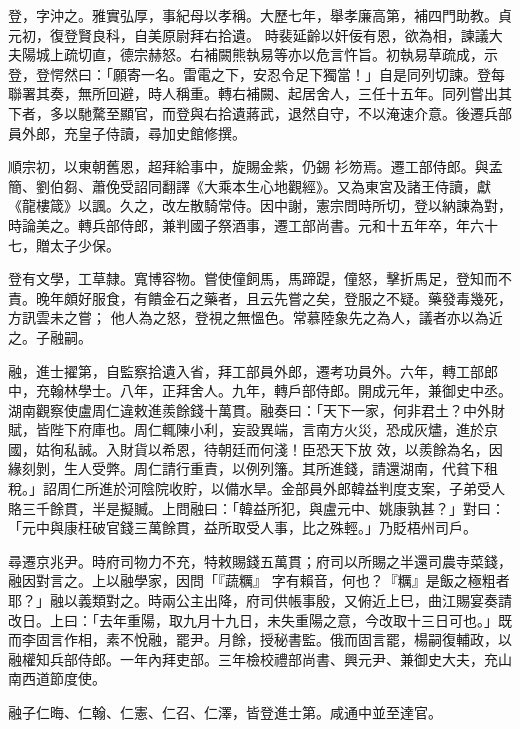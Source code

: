 \begin{pinyinscope}
 登，字沖之。雅實弘厚，事紀母以孝稱。大歷七年，舉孝廉高第，補四門助教。貞元初，復登賢良科，自美原尉拜右拾遺。
 時裴延齡以奸佞有恩，欲為相，諫議大夫陽城上疏切直，德宗赫怒。右補闕熊執易等亦以危言忤旨。初執易草疏成，示登，登愕然曰：「願寄一名。雷電之下，安忍令足下獨當！」自是同列切諫。登每聯署其奏，無所回避，時人稱重。轉右補闕、起居舍人，三任十五年。同列嘗出其下者，多以馳騖至顯官，而登與右拾遺蔣武，退然自守，不以淹速介意。後遷兵部員外郎，充皇子侍讀，尋加史館修撰。



 順宗初，以東朝舊恩，超拜給事中，旋賜金紫，仍錫
 衫笏焉。遷工部侍郎。與孟簡、劉伯芻、蕭俛受詔同翻譯《大乘本生心地觀經》。又為東宮及諸王侍讀，獻《龍樓箴》以諷。久之，改左散騎常侍。因中謝，憲宗問時所切，登以納諫為對，時論美之。轉兵部侍郎，兼判國子祭酒事，遷工部尚書。元和十五年卒，年六十七，贈太子少保。



 登有文學，工草隸。寬博容物。嘗使僮飼馬，馬蹄踶，僮怒，擊折馬足，登知而不責。晚年頗好服食，有饋金石之藥者，且云先嘗之矣，登服之不疑。藥發毒幾死，方訊雲未之嘗；
 他人為之怒，登視之無慍色。常慕陸象先之為人，議者亦以為近之。子融嗣。



 融，進士擢第，自監察拾遺入省，拜工部員外郎，遷考功員外。六年，轉工部郎中，充翰林學士。八年，正拜舍人。九年，轉戶部侍郎。開成元年，兼御史中丞。湖南觀察使盧周仁違敕進羨餘錢十萬貫。融奏曰：「天下一家，何非君土？中外財賦，皆陛下府庫也。周仁輒陳小利，妄設異端，言南方火災，恐成灰燼，進於京國，姑徇私誠。入財貨以希恩，待朝廷而何淺！臣恐天下放
 效，以羨餘為名，因緣刻剝，生人受弊。周仁請行重責，以例列籓。其所進錢，請還湖南，代貧下租稅。」詔周仁所進於河陰院收貯，以備水旱。金部員外郎韓益判度支案，子弟受人賂三千餘貫，半是擬贓。上問融曰：「韓益所犯，與盧元中、姚康孰甚？」對曰：「元中與康枉破官錢三萬餘貫，益所取受人事，比之殊輕。」乃貶梧州司戶。



 尋遷京兆尹。時府司物力不充，特敕賜錢五萬貫；府司以所賜之半還司農寺菜錢，融因對言之。上以融學家，因問「『蔬糲』
 字有賴音，何也？『糲』是飯之極粗者耶？」融以義類對之。時兩公主出降，府司供帳事殷，又俯近上巳，曲江賜宴奏請改日。上曰：「去年重陽，取九月十九日，未失重陽之意，今改取十三日可也。」既而李固言作相，素不悅融，罷尹。月餘，授秘書監。俄而固言罷，楊嗣復輔政，以融權知兵部侍郎。一年內拜吏部。三年檢校禮部尚書、興元尹、兼御史大夫，充山南西道節度使。



 融子仁晦、仁翰、仁憲、仁召、仁澤，皆登進士第。咸通中並至達官。




\end{pinyinscope}
